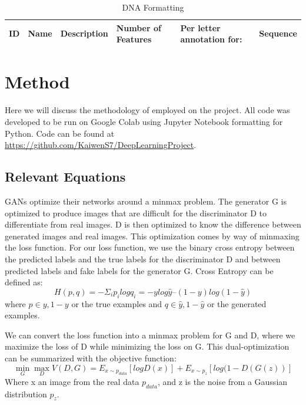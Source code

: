 \documentclass{article}
\begin{document}
	\begin{table}
		\caption{DNA Formatting}
		\centering
		\begin{tabular}{llllll}
			\toprule
			ID     & Name     & Description & Number of Features & Per letter annotation for: & Sequence \\
			\bottomrule
		\end{tabular}
		\label{tab:dna}
	\end{table}
	
	\section{Method}
	Here we will discuss the methodology of employed on the project. All code was developed to be run on Google Colab using Jupyter Notebook formatting for Python. Code can be found at \url{https://github.com/KaiwenS7/DeepLearningProject}.

	\subsection{Relevant Equations}
	\label{sec:equations}
	GANs optimize their networks around a minmax problem. The generator G is optimized to produce images that are difficult for the discriminator D to differentiate from real images. D is then optimized to know the difference between generated images and real images. This optimization comes by way of minmaxing the loss function.
	For our loss function, we use the binary cross entropy between the predicted labels and the true labels for the discriminator D and between predicted labels and fake labels for the generator G. Cross Entropy can be defined as:
	\begin{equation}
		H(p,q) = -\Sigma_{i}p_{i} log q_{i} = -y log \hat{y} – (1-y) log (1-\hat{y})
	\end{equation}
	where $p \in {y, 1-y}$ or the true examples and $q \in {\hat{y} , 1-\hat{y}}$ or the generated examples.

	We can convert the loss function into a minmax problem for G and D, where we maximize the loss of D while minimizing the loss on G. This dual-optimization can be summarized with the objective function:
	\begin{equation}
		\min_{G} \max_{D} V(D,G)= E _{x \sim p_{data}}[log D(x)] + E _{x \sim p_{z}}[log (1-D(G(z))]
	\end{equation}
	Where x an image from the real data $p_{data}$, and z is the noise from a Gaussian distribution $p_{z}$.
	
\end{document}
